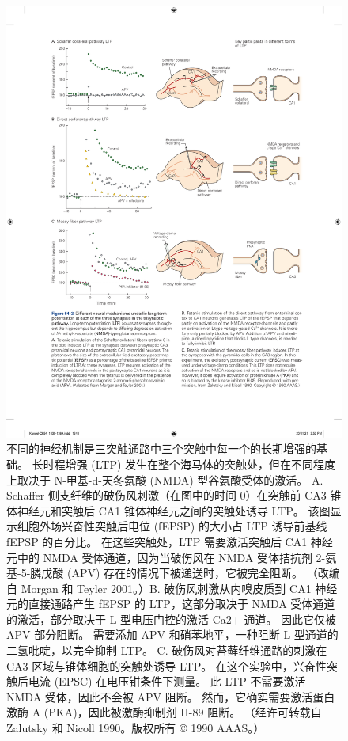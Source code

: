 \begin{figure}[htbp]
	\centering
	\includegraphics[width=0.9\linewidth]{chap54/fig_54_2}
	\caption{不同的神经机制是三突触通路中三个突触中每一个的长期增强的基础。 长时程增强 (LTP) 发生在整个海马体的突触处，但在不同程度上取决于 N-甲基-d-天冬氨酸 (NMDA) 型谷氨酸受体的激活。 A. Schaffer 侧支纤维的破伤风刺激（在图中的时间 0）在突触前 CA3 锥体神经元和突触后 CA1 锥体神经元之间的突触处诱导 LTP。 该图显示细胞外场兴奋性突触后电位 (fEPSP) 的大小占 LTP 诱导前基线 fEPSP 的百分比。 在这些突触处，LTP 需要激活突触后 CA1 神经元中的 NMDA 受体通道，因为当破伤风在 NMDA 受体拮抗剂 2-氨基-5-膦戊酸 (APV) 存在的情况下被递送时，它被完全阻断。 （改编自 Morgan 和 Teyler 2001。）B. 破伤风刺激从内嗅皮质到 CA1 神经元的直接通路产生 fEPSP 的 LTP，这部分取决于 NMDA 受体通道的激活，部分取决于 L 型电压门控的激活 Ca2+ 通道。 因此它仅被 APV 部分阻断。 需要添加 APV 和硝苯地平，一种阻断 L 型通道的二氢吡啶，以完全抑制 LTP。 C. 破伤风对苔藓纤维通路的刺激在 CA3 区域与锥体细胞的突触处诱导 LTP。 在这个实验中，兴奋性突触后电流 (EPSC) 在电压钳条件下测量。 此 LTP 不需要激活 NMDA 受体，因此不会被 APV 阻断。 然而，它确实需要激活蛋白激酶 A (PKA)，因此被激酶抑制剂 H-89 阻断。 （经许可转载自 Zalutsky 和 Nicoll 1990。版权所有 © 1990 AAAS。）}
	\label{fig:54_2}
\end{figure}


